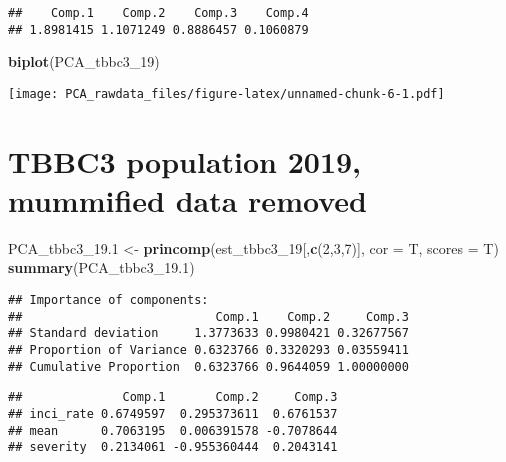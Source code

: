 \documentclass[]{article}
\newenvironment{Shaded}{\begin{snugshade}}{\end{snugshade}}
\newcommand{\DataTypeTok}[1]{\textcolor[rgb]{0.13,0.29,0.53}{#1}}
\newcommand{\DecValTok}[1]{\textcolor[rgb]{0.00,0.00,0.81}{#1}}
\newcommand{\FloatTok}[1]{\textcolor[rgb]{0.00,0.00,0.81}{#1}}
\newcommand{\KeywordTok}[1]{\textcolor[rgb]{0.13,0.29,0.53}{\textbf{#1}}}
\newcommand{\NormalTok}[1]{#1}
\newcommand{\OperatorTok}[1]{\textcolor[rgb]{0.81,0.36,0.00}{\textbf{#1}}}
\newcommand{\StringTok}[1]{\textcolor[rgb]{0.31,0.60,0.02}{#1}}
\begin{document}
\begin{verbatim}
##    Comp.1    Comp.2    Comp.3    Comp.4 
## 1.8981415 1.1071249 0.8886457 0.1060879
\end{verbatim}

\begin{Shaded}
\begin{Highlighting}[]
\KeywordTok{biplot}\NormalTok{(PCA_tbbc3_}\DecValTok{19}\NormalTok{)}
\end{Highlighting}
\end{Shaded}

\texttt{[image: PCA\_rawdata\_files/figure-latex/unnamed-chunk-6-1.pdf]}

\hypertarget{tbbc3-population-2019-mummified-data-removed}{%
\section{TBBC3 population 2019, mummified data
removed}\label{tbbc3-population-2019-mummified-data-removed}}

\begin{Shaded}
\begin{Highlighting}[]
\NormalTok{PCA_tbbc3_}\FloatTok{19.1}\NormalTok{ <-}\StringTok{ }\KeywordTok{princomp}\NormalTok{(est_tbbc3_}\DecValTok{19}\NormalTok{[,}\KeywordTok{c}\NormalTok{(}\DecValTok{2}\NormalTok{,}\DecValTok{3}\NormalTok{,}\DecValTok{7}\NormalTok{)], }\DataTypeTok{cor =}\NormalTok{ T, }\DataTypeTok{scores =}\NormalTok{ T)}
\KeywordTok{summary}\NormalTok{(PCA_tbbc3_}\FloatTok{19.1}\NormalTok{) }
\end{Highlighting}
\end{Shaded}

\begin{verbatim}
## Importance of components:
##                           Comp.1    Comp.2     Comp.3
## Standard deviation     1.3773633 0.9980421 0.32677567
## Proportion of Variance 0.6323766 0.3320293 0.03559411
## Cumulative Proportion  0.6323766 0.9644059 1.00000000
\end{verbatim}

\begin{Shaded}
\end{Shaded}

\begin{verbatim}
##              Comp.1       Comp.2     Comp.3
## inci_rate 0.6749597  0.295373611  0.6761537
## mean      0.7063195  0.006391578 -0.7078644
## severity  0.2134061 -0.955360444  0.2043141
\end{verbatim}
\end{document}
